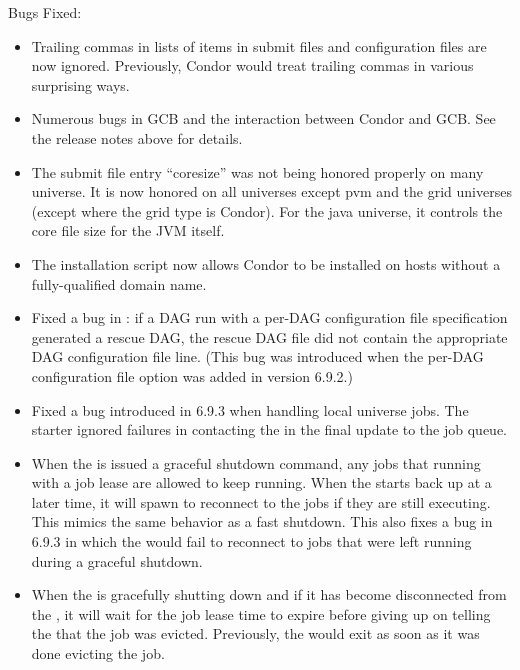 \noindent Bugs Fixed:

\begin{itemize}

\item Trailing commas in lists of items in submit files and 
configuration files are now ignored.  Previously, Condor would treat trailing
commas in various surprising ways.

\item Numerous bugs in GCB and the interaction between Condor and GCB.
  See the release notes above for details.

\item The submit file entry ``coresize'' was not being honored properly on
many universe. It is now honored on all universes except pvm and the grid
universes (except where the grid type is Condor). For the java universe,
it controls the core file size for the JVM itself.

\item The  installation script now allows Condor
to be installed on hosts without a fully-qualified domain name.

\item Fixed a bug in : if a DAG run with a per-DAG
configuration file specification generated a rescue DAG, the rescue
DAG file did not contain the appropriate DAG configuration file line.
(This bug was introduced when the per-DAG configuration file option
was added in version 6.9.2.)

\item Fixed a bug introduced in 6.9.3 when handling local universe jobs.
The starter ignored failures in contacting the  in the
final update to the job queue.

\item When the  is issued a graceful shutdown command, any jobs
that running with a job lease are allowed to keep running. When the 
starts back up at a later time, it will spawn  to reconnect
to the jobs if they are still executing. This mimics the same behavior as
a fast shutdown.  This also fixes a bug in 6.9.3 in which the 
would fail to reconnect to jobs that were left running during a graceful
shutdown.

\item When the  is gracefully shutting down and if it
has become disconnected from the , it will wait for the
job lease time to expire before giving up on telling the 
that the job was evicted.  Previously, the  would exit
as soon as it was done evicting the job.


\end{itemize}
